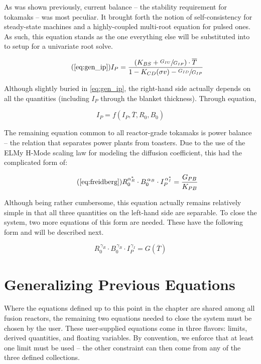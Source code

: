 As was shown previously, current balance -- the stability requirement for tokamaks -- was most peculiar. It brought forth the notion of self-consistency for steady-state machines and a highly-coupled multi-root equation for pulsed ones. As such, this equation stands as the one everything else will be substituted into to setup for a univariate root solve.

\begin{equation}
	\tag{\ref{eq:gen_ip}}
	I_P = \frac{ \left( K_{BS} + \sfrac{ G_{IU} }{ G_{IP} } \right) \cdot \overline T }{ 1 - K_{CD} ( \sigma v ) - \sfrac{ G_{ID} }{ G_{IP} } }
\end{equation}

Although slightly buried in \cref{eq:gen_ip}, the right-hand side actually depends on all the quantities (including $I_P$ through the blanket thickness). Through equation,

\begin{equation}
	I_P = f(I_P, \overline T, R_0, B_0)
\end{equation}

The remaining equation common to all reactor-grade tokamaks is power balance -- the relation that separates power plants from toasters. Due to the use of the ELMy H-Mode scaling law for modeling the diffusion coefficient, this had the complicated form of:

\begin{equation}
	\tag{\ref{eq:freidberg}}
	R_0^{ \alpha_R^* } \cdot B_0^{\,\alpha_B} \cdot I_P^{\,\alpha_I^*} = \frac{ G_{PB} }{ K_{PB} }
\end{equation}

Although being rather cumbersome, this equation actually remains relatively simple in that all three quantities on the left-hand side are separable. To close the system, two more equations of this form are needed. These have the following form and will be described next.

\begin{equation}
	\label{eq:rbi}
	R_0^{\, \gamma_R} \cdot B_0^{\, \gamma_B} \cdot I_P^{\, \gamma_I} = G( \overline T )
\end{equation}

\section{Generalizing Previous Equations}

Where the equations defined up to this point in the chapter are shared among all fusion reactors, the remaining two equations needed to close the system must be chosen by the user. These user-supplied equations come in three flavors: limits, derived quantities, and floating variables. By convention, we enforce that at least one limit must be used -- the other constraint can then come from any of the three defined collections.

